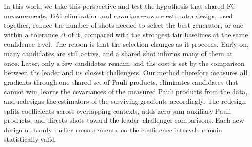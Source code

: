 \documentclass[aps,pra,reprint,superscriptaddress,nofootinbib]{revtex4-2}
\begin{document}
In this work, we take this perspective and test the hypothesis that shared FC measurements, BAI elimination and covariance-aware estimator design, used together, reduce the number of shots needed to select the best generator, or one within a tolerance $\Delta$ of it, compared with the strongest fair baselines at the same confidence level. The reason is that the selection changes as it proceeds. Early on, many candidates are still active, and a shared shot informs many of them at once. Later, only a few candidates remain, and the cost is set by the comparison between the leader and its closest challengers. Our method therefore measures all gradients through one shared set of Pauli products, eliminates candidates that cannot win, learns the covariances of the measured Pauli products from the data, and redesigns the estimators of the surviving gradients accordingly. The redesign splits coefficients across overlapping contexts, adds zero-sum auxiliary Pauli products, and directs shots toward the leader--challenger comparisons. Each new design uses only earlier measurements, so the confidence intervals remain statistically valid.




\end{document}
